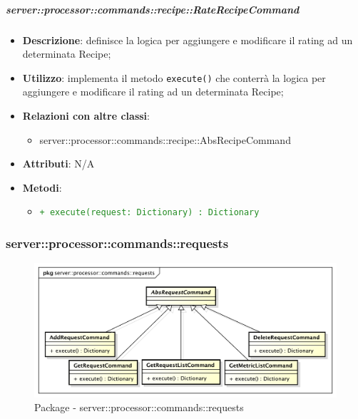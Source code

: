         \subparagraph{server::processor::commands::recipe::RateRecipeCommand} %
        \label{subp:bdsm_app_server_processor_commands_recipe_raterecipecommand}
        \begin{itemize}
          \item \textbf{Descrizione}: definisce la logica per aggiungere e modificare il rating ad un determinata Recipe;
          \item \textbf{Utilizzo}: implementa il metodo \texttt{execute()} che conterrà la logica per aggiungere e modificare il rating ad un determinata Recipe;
          \item \textbf{Relazioni con altre classi}:
            \begin{itemize}
              \item server::processor::commands::recipe::AbsRecipeCommand
            \end{itemize}
          \item \textbf{Attributi}: N/A
          \item \textbf{Metodi}:
          \begin{itemize}
              \item \textcolor{forestgreen}{\texttt{+ execute(request: Dictionary) : Dictionary}}
          \end{itemize}
        \end{itemize}


      \subsubsection{server::processor::commands::requests} %
      \label{ssub:bdsm_app_server_processor_commands_requests}
      \begin{figure}[!htbp]
        \centering
        \centerline{\includegraphics[scale=0.5]{./images/server/requests.pdf}}
        \caption{Package - server::processor::commands::requests}
      \end{figure}

